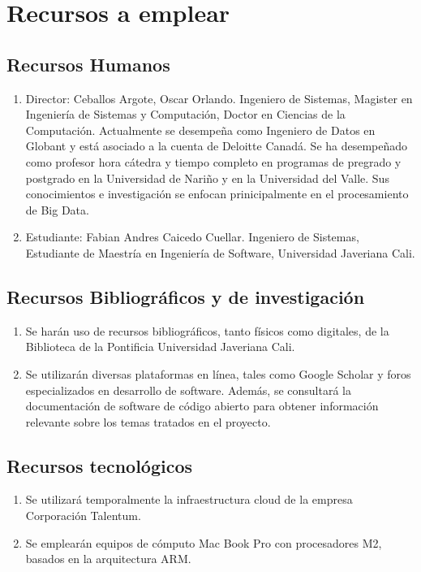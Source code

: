 \section{Recursos a emplear}
\label{sec:recursos}
\subsection{Recursos Humanos}
\begin{enumerate}
    \item Director: Ceballos Argote, Oscar Orlando. Ingeniero de Sistemas, Magister en Ingenier\'ia de Sistemas y Computaci\'on, Doctor en Ciencias de la Computaci\'on. Actualmente se desempe\~na como Ingeniero de Datos en Globant y est\'a asociado a la cuenta de Deloitte Canad\'a. Se ha desempe\~nado como profesor hora c\'atedra y tiempo completo en programas de pregrado y postgrado en la Universidad de Nari\~no y en la Universidad del Valle. Sus conocimientos e investigaci\'on se enfocan prinicipalmente en el procesamiento de Big Data.
    \item Estudiante: Fabian Andres Caicedo Cuellar. Ingeniero de Sistemas, Estudiante de Maestría en Ingeniería de Software, Universidad Javeriana Cali.
\end{enumerate}

\subsection{Recursos Bibliográficos y de investigación}
\begin{enumerate}
    \item Se harán uso de recursos bibliográficos, tanto físicos como digitales, de la Biblioteca de la Pontificia Universidad Javeriana Cali.

    \item Se utilizarán diversas plataformas en línea, tales como Google Scholar y foros especializados en desarrollo de software. Además, se consultará la documentación de software de código abierto para obtener información relevante sobre los temas tratados en el proyecto.
\end{enumerate}

\subsection{Recursos tecnológicos}
\begin{enumerate}
    \item Se utilizará temporalmente la infraestructura cloud de la empresa Corporación Talentum.
    \item Se emplearán equipos de cómputo Mac Book Pro con procesadores M2, basados en la arquitectura ARM.
\end{enumerate}